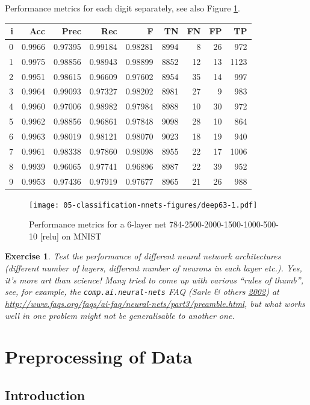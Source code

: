 \documentclass[10pt,b5paper,krantz1]{krantz}
\newtheorem{exercise}{Exercise}[chapter]
\begin{document}
Performance metrics for each digit separately,
see also Figure \ref{fig:deep63}.

\begin{longtable}[]{@{}rrrrrrrrr@{}}
\toprule
i & Acc & Prec & Rec & F & TN & FN & FP & TP\tabularnewline
\midrule
\endhead
0 & 0.9966 & 0.97395 & 0.99184 & 0.98281 & 8994 & 8 & 26 & 972\tabularnewline
1 & 0.9975 & 0.98856 & 0.98943 & 0.98899 & 8852 & 12 & 13 & 1123\tabularnewline
2 & 0.9951 & 0.98615 & 0.96609 & 0.97602 & 8954 & 35 & 14 & 997\tabularnewline
3 & 0.9964 & 0.99093 & 0.97327 & 0.98202 & 8981 & 27 & 9 & 983\tabularnewline
4 & 0.9960 & 0.97006 & 0.98982 & 0.97984 & 8988 & 10 & 30 & 972\tabularnewline
5 & 0.9962 & 0.98856 & 0.96861 & 0.97848 & 9098 & 28 & 10 & 864\tabularnewline
6 & 0.9963 & 0.98019 & 0.98121 & 0.98070 & 9023 & 18 & 19 & 940\tabularnewline
7 & 0.9961 & 0.98338 & 0.97860 & 0.98098 & 8955 & 22 & 17 & 1006\tabularnewline
8 & 0.9939 & 0.96065 & 0.97741 & 0.96896 & 8987 & 22 & 39 & 952\tabularnewline
9 & 0.9953 & 0.97436 & 0.97919 & 0.97677 & 8965 & 21 & 26 & 988\tabularnewline
\bottomrule
\end{longtable}

\begin{figure}
\hypertarget{fig:deep63}{%
\centering
\texttt{[image: 05-classification-nnets-figures/deep63-1.pdf]}
\caption{Performance metrics for a 6-layer net 784-2500-2000-1500-1000-500-10 {[}relu{]} on MNIST}\label{fig:deep63}
}
\end{figure}

\begin{exercise}

Test the performance of different neural network
architectures (different number of layers, different number
of neurons in each layer etc.). Yes, it's more art than science!
Many tried to come up with various ``rules of thumb'',
see, for example, the \texttt{comp.ai.neural-nets} FAQ (Sarle \& others \protect\hyperlink{ref-aifaq}{2002}) at
\url{http://www.faqs.org/faqs/ai-faq/neural-nets/part3/preamble.html},
but what works well in one problem might not be generalisable
to another one.

\end{exercise}

\hypertarget{preprocessing-of-data}{%
\section{Preprocessing of Data}\label{preprocessing-of-data}}

\hypertarget{introduction-9}{%
\subsection{Introduction}\label{introduction-9}}
\end{document}
